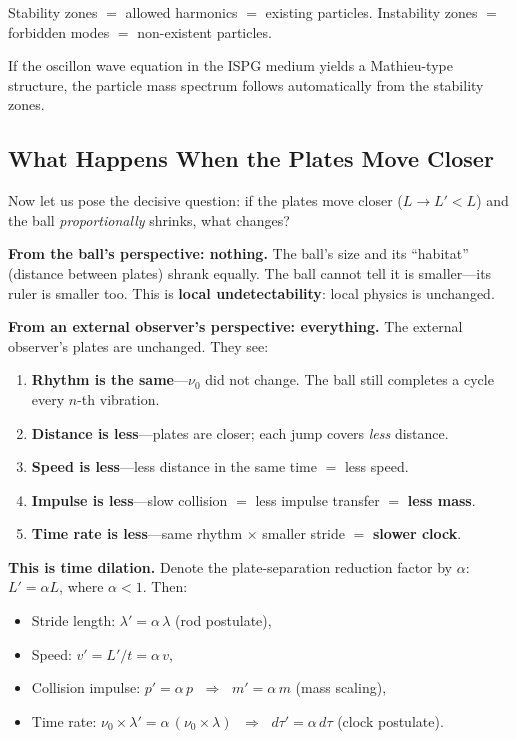 \documentclass[11pt]{article}
\begin{document}
Stability zones $=$ allowed harmonics $=$ existing particles.
Instability zones $=$ forbidden modes $=$ non-existent particles.

If the oscillon wave equation in the ISPG medium yields a
Mathieu-type structure, the particle mass spectrum follows
automatically from the stability zones.

\subsection{What Happens When the Plates Move Closer}

Now let us pose the decisive question: if the plates move closer
($L \to L' < L$) and the ball \emph{proportionally} shrinks, what
changes?

\medskip
\textbf{From the ball's perspective: nothing.}
The ball's size and its ``habitat'' (distance between plates) shrank
equally. The ball cannot tell it is smaller---its ruler is smaller
too. This is \textbf{local undetectability}: local physics is
unchanged.

\medskip
\textbf{From an external observer's perspective: everything.}
The external observer's plates are unchanged. They see:
\begin{enumerate}
  \item \textbf{Rhythm is the same}---$\nu_0$ did not change. The
    ball still completes a cycle every $n$-th vibration.
  \item \textbf{Distance is less}---plates are closer; each jump
    covers \emph{less} distance.
  \item \textbf{Speed is less}---less distance in the same time
    $=$ less speed.
  \item \textbf{Impulse is less}---slow collision $=$ less impulse
    transfer $=$ \textbf{less mass}.
  \item \textbf{Time rate is less}---same rhythm $\times$ smaller
    stride $=$ \textbf{slower clock}.
\end{enumerate}

\medskip
\textbf{This is time dilation.}
Denote the plate-separation reduction factor by $\alpha$:
$L' = \alpha L$, where $\alpha < 1$. Then:
\begin{itemize}
  \item Stride length: $\lambda' = \alpha\,\lambda$
    \quad(rod postulate),
  \item Speed: $v' = L'/t = \alpha\,v$,
  \item Collision impulse: $p' = \alpha\,p$
    $\;\Rightarrow\;$ $m' = \alpha\,m$
    \quad(mass scaling),
  \item Time rate: $\nu_0 \times \lambda'
    = \alpha\,(\nu_0 \times \lambda)$
    $\;\Rightarrow\;$ $d\tau' = \alpha\,d\tau$
    \quad(clock postulate).
\end{itemize}
\end{document}
